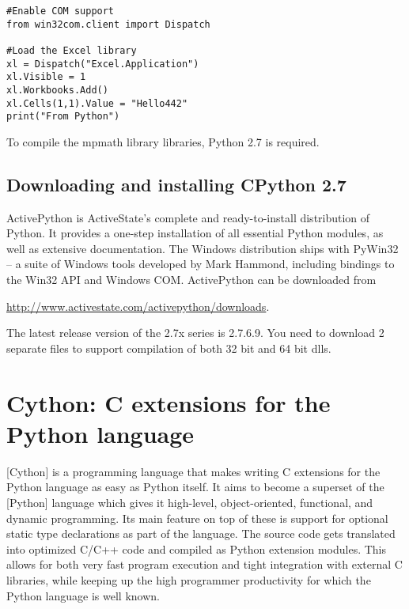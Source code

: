 \begin{lstlisting}
#Enable COM support
from win32com.client import Dispatch

#Load the Excel library
xl = Dispatch("Excel.Application")
xl.Visible = 1
xl.Workbooks.Add() 
xl.Cells(1,1).Value = "Hello442" 
print("From Python")
\end{lstlisting}



To compile the mpmath library libraries, Python 2.7 is required.

\subsection{Downloading and installing  CPython 2.7}
ActivePython is ActiveState's complete and ready-to-install distribution of Python. It provides a one-step installation of all essential Python modules, as well as extensive documentation. 
The Windows distribution ships with PyWin32 -- a suite of Windows tools developed by Mark Hammond, including bindings to the Win32 API and Windows COM. 
ActivePython can be downloaded from

\vpara
\href{http://www.activestate.com/activepython/downloads}{http://www.activestate.com/activepython/downloads}.

\vpara
The latest release version of the 2.7x series is 2.7.6.9. You need to download 2 separate files to support compilation of both 32 bit and 64 bit dlls.





\newpage
\section{Cython: C extensions for the Python language}

[Cython] is a programming language that makes writing C extensions for the Python language as easy as Python itself. It aims to become a superset of the [Python] language which gives it high-level, object-oriented, functional, and dynamic programming. Its main feature on top of these is support for optional static type declarations as part of the language. The source code gets translated into optimized C/C++ code and compiled as Python extension modules. This allows for both very fast program execution and tight integration with external C libraries, while keeping up the high programmer productivity for which the Python language is well known.


